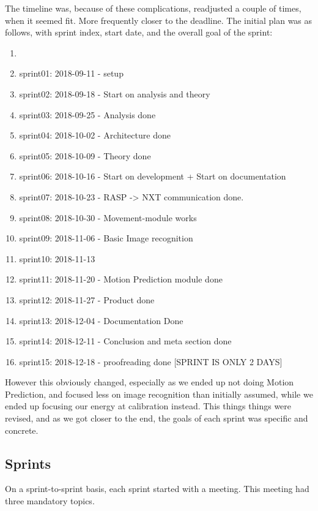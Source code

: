 The timeline was, because of these complications, readjusted a couple of times, when it seemed fit. 
More frequently closer to the deadline. 
The initial plan was as follows, with sprint index, start date, and the overall goal of the sprint:
\begin{enumerate}
	\item 
	\item sprint01: 2018-09-11 - setup
	\item sprint02: 2018-09-18 - Start on analysis and theory
	\item sprint03: 2018-09-25 - Analysis done 
	\item sprint04: 2018-10-02 - Architecture done
	\item sprint05: 2018-10-09 - Theory done
	\item sprint06: 2018-10-16 - Start on development + Start on documentation
	\item sprint07: 2018-10-23 - RASP -> NXT communication done.
	\item sprint08: 2018-10-30 - Movement-module works
	\item sprint09: 2018-11-06 - Basic Image recognition
	\item sprint10: 2018-11-13
	\item sprint11: 2018-11-20 - Motion Prediction module done
	\item sprint12: 2018-11-27 - Product done
	\item sprint13: 2018-12-04 - Documentation Done
	\item sprint14: 2018-12-11 - Conclusion and meta section done
	\item sprint15: 2018-12-18 - proofreading done [SPRINT IS ONLY 2 DAYS]
\end{enumerate}

However this obviously changed, especially as we ended up not doing Motion Prediction, and focused less on image recognition than initially assumed, while we ended up focusing our energy at calibration instead.
This things things were revised, and as we got closer to the end, the goals of each sprint was specific and concrete. 

\subsection{Sprints}
On a sprint-to-sprint basis, each sprint started with a meeting.
This meeting had three mandatory topics.


